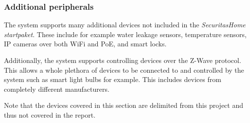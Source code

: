 \subsubsection{Additional peripherals}
The system supports many additional devices not included in the \textit{SecuritasHome startpaket}. These include for example water leakage sensors, temperature sensors, IP cameras over both WiFi and PoE, and smart locks.

Additionally, the system supports controlling devices over the Z-Wave protocol. This allows a whole plethora of devices to be connected to and controlled by the system such as smart light bulbs for example. This includes devices from completely different manufacturers.

Note that the devices covered in this section are delimited from this project and thus not covered in the report.

